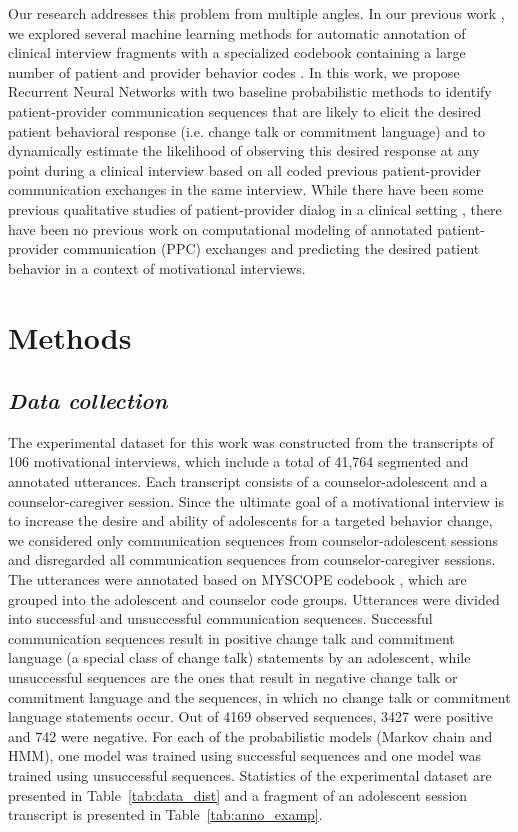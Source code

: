 \documentclass{amia_summit_2018}
\begin{document}
Our research addresses this problem from multiple angles. In our previous work \cite{kotov2015interpretable, hasan2016study}, we explored several machine learning methods for automatic annotation of clinical interview fragments with a specialized codebook containing a large number of patient and provider behavior codes \cite{carcone2013provider}. In this work, we propose Recurrent Neural Networks with two baseline probabilistic methods to identify patient-provider communication sequences that are likely to elicit the desired patient behavioral response (i.e. change talk or commitment language) and to dynamically estimate the likelihood of observing this desired response at any point during a clinical interview based on all coded previous patient-provider communication exchanges in the same interview. While there have been some previous qualitative studies of patient-provider dialog in a clinical setting \cite{eide2004physician}, there have been no previous work on computational modeling of annotated patient-provider communication (PPC) exchanges and predicting the desired patient behavior in a context of motivational interviews.   

\section*{Methods}
\subsection*{\textit{Data collection}}
The experimental dataset for this work was constructed from the transcripts of 106 motivational interviews, which include a total of 41,764 segmented and annotated utterances. Each transcript consists of a counselor-adolescent and a counselor-caregiver session. Since the ultimate goal of a motivational interview is to increase the desire and ability of adolescents for a targeted behavior change, we considered only communication sequences from counselor-adolescent sessions and disregarded all communication sequences from counselor-caregiver sessions. The utterances were annotated based on MYSCOPE codebook \cite{carcone2013provider}, which are grouped into the adolescent and counselor code groups. Utterances were divided into successful and unsuccessful communication sequences. Successful communication sequences result in positive change talk and commitment language (a special class of change talk) statements by an adolescent, while unsuccessful sequences are the ones that result in negative change talk or commitment language and the sequences, in which no change talk or commitment language statements occur. Out of 4169 observed sequences, 3427 were positive and 742 were negative. For each of the probabilistic models (Markov chain and HMM), one model was trained using successful sequences and one model was trained using unsuccessful sequences. Statistics of the experimental dataset are presented in Table~\ref{tab:data_dist} and a fragment of an adolescent session transcript is presented in Table~\ref{tab:anno_examp}. \\
\end{document}
